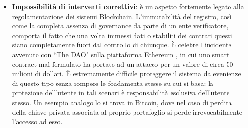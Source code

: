\begin{itemize}
				\item \textbf{Impossibilità di interventi correttivi}: è un aspetto fortemente legato alla regolamentazione dei sistemi Blockchain. L'immutabilità del registro, così come la completa assenza di governance da parte di un ente verificatore, comporta il fatto che una volta immessi dati o stabiliti dei contrati questi siano completamente fuori dal controllo di chiunque. È celebre l'incidente avvenuto con ``The DAO" sulla piattaforma Ethereum \cite{theDAO}, in cui uno smart contract mal formulato ha portato ad un attacco per un valore di circa 50 milioni di dollari. È estremamente difficile proteggere il sistema da evenienze di questo tipo senza rompere le fondamenta stesse su cui si basa: la protezione dell'utente in tali scenari è responsabilità esclusiva dell'utente stesso. Un esempio analogo lo si trova in Bitcoin, dove nel caso di perdita della chiave privata associata al proprio portafoglio si perde irrevocabilmente l'accesso ad esso. 
			\end{itemize}
